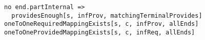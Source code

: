 \lstset{frame=tb, aboveskip=12pt, belowskip=-3pt, breaklines=true, basicstyle=\small\ttfamily, tabsize=2, mathescape=true}
\begin{lstlisting}[caption={port\_inference.als, lines 148-151}, label=alloy:WF_PI_PROVIDES_ENOUGH, captionpos=b]
no end.partInternal =>
  providesEnough[s, infProv, matchingTerminalProvides]
oneToOneRequiredMappingExists[s, c, infProv, allEnds]
oneToOneProvidedMappingExists[s, c, infReq, allEnds]
\end{lstlisting}